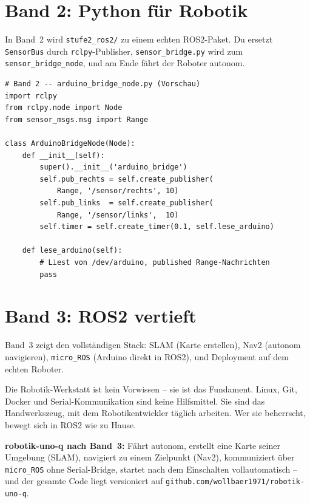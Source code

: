 \section{Band 2: Python für Robotik}

In Band~2 wird \texttt{stufe2\_ros2/} zu einem echten
ROS2-Paket. Du ersetzt \texttt{SensorBus} durch
\texttt{rclpy}-Publisher, \texttt{sensor\_bridge.py}
wird zum \texttt{sensor\_bridge\_node}, und am Ende
fährt der Roboter autonom.

\begin{lstlisting}[style=python]
# Band 2 -- arduino_bridge_node.py (Vorschau)
import rclpy
from rclpy.node import Node
from sensor_msgs.msg import Range

class ArduinoBridgeNode(Node):
    def __init__(self):
        super().__init__('arduino_bridge')
        self.pub_rechts = self.create_publisher(
            Range, '/sensor/rechts', 10)
        self.pub_links  = self.create_publisher(
            Range, '/sensor/links',  10)
        self.timer = self.create_timer(0.1, self.lese_arduino)

    def lese_arduino(self):
        # Liest von /dev/arduino, published Range-Nachrichten
        pass
\end{lstlisting}

\section{Band 3: ROS2 vertieft}

Band~3 zeigt den vollständigen Stack:
SLAM (Karte erstellen), Nav2 (autonom navigieren),
\texttt{micro\_ROS} (Arduino direkt in ROS2),
und Deployment auf dem echten Roboter.

\begin{merksatzBox}
Die Robotik-Werkstatt ist kein Vorwissen -- sie ist das Fundament.
Linux, Git, Docker und Serial-Kommunikation sind
keine Hilfsmittel. Sie sind das Handwerkszeug,
mit dem Robotikentwickler täglich arbeiten.
Wer sie beherrscht, bewegt sich in ROS2 wie zu Hause.
\end{merksatzBox}

\begin{robotikBox}
\textbf{robotik-uno-q nach Band~3:}
Fährt autonom, erstellt eine Karte seiner Umgebung (SLAM),
navigiert zu einem Zielpunkt (Nav2), kommuniziert über
\texttt{micro\_ROS} ohne Serial-Bridge, startet nach
dem Einschalten vollautomatisch -- und der gesamte Code
liegt versioniert auf \texttt{github.com/wollbaer1971/robotik-uno-q}.
\end{robotikBox}
